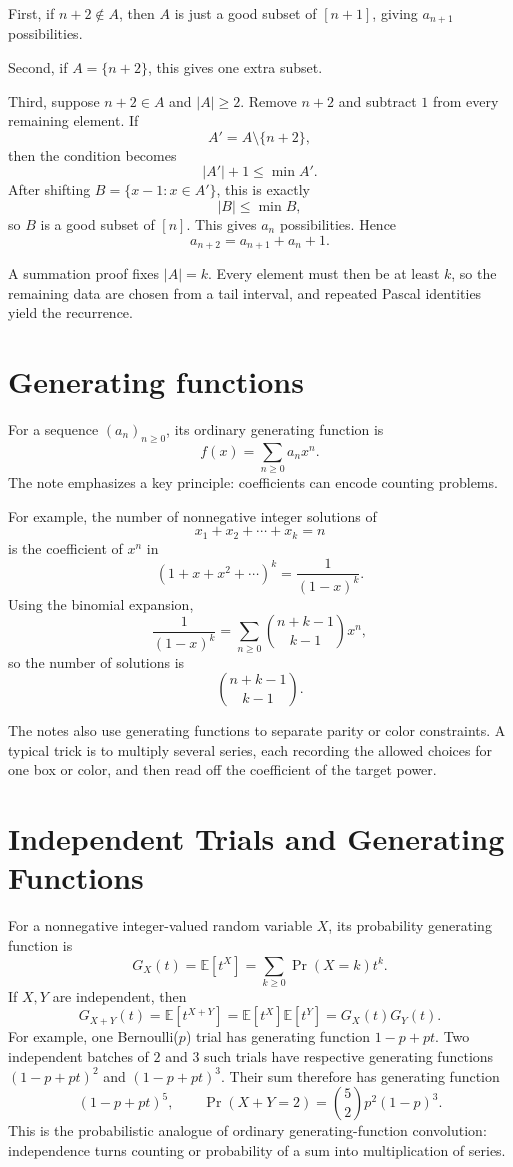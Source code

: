 First, if $n+2\notin A$, then $A$ is just a good subset of $[n+1]$, giving $a_{n+1}$ possibilities.

Second, if $A=\{n+2\}$, this gives one extra subset.

Third, suppose $n+2\in A$ and $|A|\ge2$.  Remove $n+2$ and subtract $1$ from every remaining element.  If
\[
  A'=A\setminus\{n+2\},
\]
then the condition becomes
\[
  |A'|+1\le \min A'.
\]
After shifting $B=\{x-1:x\in A'\}$, this is exactly
\[
  |B|\le \min B,
\]
so $B$ is a good subset of $[n]$.  This gives $a_n$ possibilities.  Hence
\[
  a_{n+2}=a_{n+1}+a_n+1.
\]

A summation proof fixes $|A|=k$.  Every element must then be at least $k$, so the remaining data are chosen from a tail interval, and repeated Pascal identities yield the recurrence.

\section{Generating functions}

For a sequence $(a_n)_{n\ge0}$, its ordinary generating function is
\[
  f(x)=\sum_{n\ge0}a_nx^n.
\]
The note emphasizes a key principle: coefficients can encode counting problems.

For example, the number of nonnegative integer solutions of
\[
  x_1+x_2+\cdots+x_k=n
\]
is the coefficient of $x^n$ in
\[
  (1+x+x^2+\cdots)^k=\frac1{(1-x)^k}.
\]
Using the binomial expansion,
\[
  \frac1{(1-x)^k}=\sum_{n\ge0}\binom{n+k-1}{k-1}x^n,
\]
so the number of solutions is
\[
  \binom{n+k-1}{k-1}.
\]

The notes also use generating functions to separate parity or color constraints.  A typical trick is to multiply several series, each recording the allowed choices for one box or color, and then read off the coefficient of the target power.

\enlargethispage{4\baselineskip}
\section{Independent Trials and Generating Functions}

For a nonnegative integer-valued random variable \(X\), its probability generating function is
\[
 G_X(t)=\mathbb E[t^X]=\sum_{k\ge0}\Pr(X=k)t^k.
\]
If \(X,Y\) are independent, then
\[
 G_{X+Y}(t)=\mathbb E[t^{X+Y}]
 =\mathbb E[t^X]\mathbb E[t^Y]=G_X(t)G_Y(t).
\]
For example, one Bernoulli(\(p\)) trial has generating function \(1-p+pt\). Two independent batches of \(2\) and \(3\) such trials have respective generating functions \((1-p+pt)^2\) and \((1-p+pt)^3\). Their sum therefore has generating function
\[
 (1-p+pt)^5,\qquad
 \Pr(X+Y=2)=\binom52p^2(1-p)^3.
\]
This is the probabilistic analogue of ordinary generating-function convolution: independence turns counting or probability of a sum into multiplication of series.

